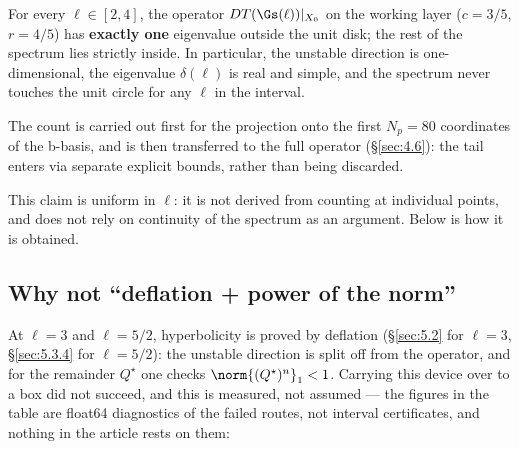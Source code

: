 \begin{theorem}
For every $\ell \in [2, 4]$, the operator
$DT(\Gs(\ell))|_{X_{0}}$ on the working layer ($c = 3/5$, $r = 4/5$) has
\textbf{exactly one} eigenvalue outside the unit disk; the rest of the spectrum
lies strictly inside. In particular, the unstable direction is
one-dimensional, the eigenvalue $\delta(\ell)$ is real and simple, and the spectrum
never touches the unit circle for any $\ell$ in the interval.

The count is carried out first for the projection onto the first
$N_p = 80$ coordinates of the b-basis, and is then transferred to the full
operator (\S\ref{sec:4.6}): the tail enters via separate explicit bounds, rather
than being discarded.
\end{theorem}

This claim is uniform in $\ell$: it is not derived from counting at individual
points, and does not rely on continuity of the spectrum as an argument.
Below is how it is obtained.


\subsection{Why not ``deflation + power of the norm''}\label{sec:4.2}

At $\ell = 3$ and $\ell = 5/2$, hyperbolicity is proved by deflation (\S\ref{sec:5.2} for $\ell=3$,
\S\ref{sec:5.3.4} for $\ell=5/2$): the unstable direction is split off from the operator,
and for the remainder $Q^{\star}$ one checks $\norm{(Q^{\star})^{n}}_{1} < 1$. Carrying this device
over to a box did not succeed, and this is measured, not assumed --- the
figures in the table are float64 diagnostics of the failed routes, not
interval certificates, and nothing in the article rests on them:

